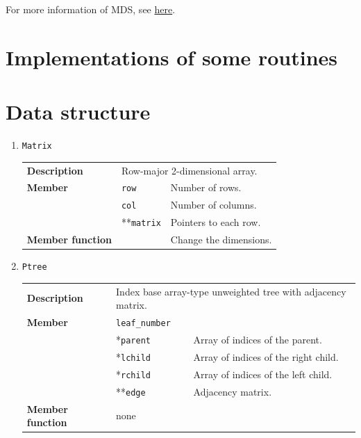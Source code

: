\documentclass[11pt,a4paper]{article}
\newcommand{\myuline}[1]{%
	\uline{\phantom{#1}}%
	\llap{\contour{white}{#1}}%
}
\newcommand{\mrref}[1]{\texttt{#1}\label{#1}}
\newcommand{\mmemref}[2]{\texttt{#1}\label{#2#1}}
\newcommand{\mtref}[2]{\texttt{#1}\label{#2}}
\newcommand{\tref}[2]{\hyperref[#2]{\textcolor{blue}{\myuline{\texttt{#1}}}}}
\theoremstyle{definition}
\theoremstyle{definition}
\numberwithin{equation}{section}
\begin{document}
	
	
	For more information of MDS, see \href{https://en.wikipedia.org/wiki/Multidimensional_scaling}{here}.
	
	\section*{Implementations of some routines}
	
	
	\section*{Data structure}
	
	
	\begin{enumerate}
		\item \mrref{Matrix}
			
			\begin{tabular}{>{\bfseries}lp{}p{}}
				Description & \multicolumn{2}{p{0.8\textwidth}}{Row-major 2-dimensional array.} \\
				Member & \mtref{row}{MatrixRow} & Number of rows.\\
				&\mtref{col}{MatrixCol} & Number of columns.\\
				&**\mmemref{matrix}{MatrixMatrix} & Pointers to each row.\\
				Member function& \tref{resize}{MatrixResize} & Change the dimensions. \\
			\end{tabular}
		
		\item \mrref{Ptree}
		
			\begin{tabular}{>{\bfseries}lp{}p{}}
				Description & \multicolumn{2}{p{0.8\textwidth}}{Index base array-type unweighted tree with adjacency matrix.} \\
				Member & \mtref{leaf\_number}{leafnumber} &\\
				&*\mmemref{parent}{Ptree} & Array of indices of the parent.\\
				&*\mmemref{lchild}{Ptree} & Array of indices of the right child.\\
				&*\mmemref{rchild}{Ptree} & Array of indices of the left child.\\
				&**\mmemref{edge}{Ptree}  & Adjacency matrix.\\
				Member function& none &  \\
			\end{tabular}
		

\end{enumerate}
\end{document}
